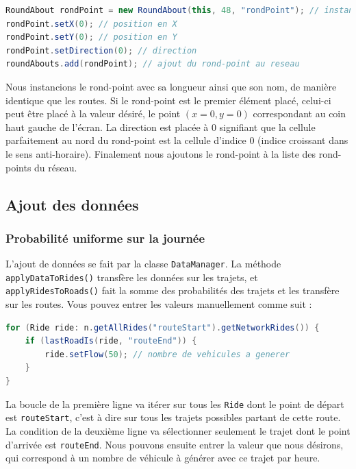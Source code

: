 \documentclass[a4paper,11pt, titlepage]{extarticle}
\begin{document}
\begin{lstlisting}[language=Java]
RoundAbout rondPoint = new RoundAbout(this, 48, "rondPoint"); // instanciation
rondPoint.setX(0); // position en X
rondPoint.setY(0); // position en Y
rondPoint.setDirection(0); // direction
roundAbouts.add(rondPoint); // ajout du rond-point au reseau
\end{lstlisting}

Nous instancions le rond-point avec sa longueur ainsi que son nom, de manière identique que les routes. Si le rond-point est le premier élément placé, celui-ci peut être placé à la valeur désiré, le point $(x=0,y=0)$ correspondant au coin haut gauche de l'écran. La direction est placée à 0 signifiant que la cellule parfaitement au nord du rond-point est la cellule d'indice 0 (indice croissant dans le sens anti-horaire). Finalement nous ajoutons le rond-point à la liste des rond-points du réseau.

\subsection{Ajout des données}

\subsubsection{Probabilité uniforme sur la journée}

L'ajout de données se fait par la classe \texttt{DataManager}. La méthode \texttt{applyDataToRides()} transfère les données sur les trajets, et \texttt{applyRidesToRoads()} fait la somme des probabilités des trajets et les transfère sur les routes. Vous pouvez entrer les valeurs manuellement comme suit : 

\begin{lstlisting}[language=Java]
for (Ride ride: n.getAllRides("routeStart").getNetworkRides()) {
	if (lastRoadIs(ride, "routeEnd")) {
		ride.setFlow(50); // nombre de vehicules a generer
	}
}
\end{lstlisting}

La boucle de la première ligne va itérer sur tous les \texttt{Ride} dont le point de départ est \texttt{routeStart}, c'est à dire sur tous les trajets possibles partant de cette route. La condition de la deuxième ligne va sélectionner seulement le trajet dont le point d'arrivée est \texttt{routeEnd}. Nous pouvons ensuite entrer la valeur que nous désirons, qui correspond à un nombre de véhicule à générer avec ce trajet par heure.
\end{document}

